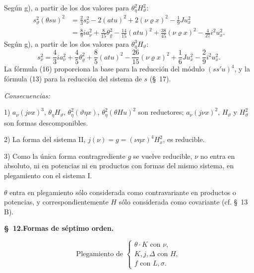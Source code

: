 \documentclass[11pt]{article}
\newcommand{\A}{\Delta}
\newcommand{\R}{\varrho}
\begin{document}
Según g), a partir de los dos valores para $\theta_\eta^2H_\vartheta^2$:
\[
\tag{15}
\begin{aligned}
s_\vartheta^2(\theta su)^2
&=\frac23s_\nu^2-2(atu)^2+2(\nu\R x)^2-\frac19Ju_x^2\\
&=\frac89ia_\nu^2+\frac8{15}\theta_\R^2-\frac{14}{15}(atu)^2+\frac{38}{45}(\nu\R x)^2-\frac4{27}i^2u_x^2.
\end{aligned}
\]
Según g), a partir de los dos valores para $\theta_\eta^3H_\vartheta$:
\[
\tag{16}
s_\nu^2=\frac43ia_\nu^2+\frac45\theta_\R^2+\frac85(atu)^2-\frac{26}{15}(\nu\R x)^2+\frac16Ju_x^2-\frac29i^2u_x^2.
\]
La fórmula (16) proporciona la base para la reducción del módulo $(ss'u)^4$, y la fórmula (13) para la reducción del sistema de $s$ (\S\ 17).

\noindent\emph{Consecuencias:}

1) $a_\nu(j\nu x)^3$, $\theta_\eta H_\vartheta$, $\theta_\eta^2(\vartheta\eta x)$, $\theta_\eta^2(\theta Hu)^2$ son reductores; $a_\nu(j\nu x)^2$, $H_\vartheta$ y $H_\vartheta^2$ son formas descomponibles.

2) La forma del sistema II, $j(\nu)=g=(\nu\eta x)^4H_x^2$, es reducible.

3) Como la única forma contragrediente $g$ se vuelve reducible, $\nu$ no entra en absoluto, ni en potencias ni en productos con formas del mismo sistema, en plegamiento con el sistema I.

$\theta$ entra en plegamiento sólo considerada como contravariante en productos o potencias, y correspondientemente $H$ sólo considerada como covariante (cf. \S\ 13 B).




\begin{center}
\textbf{\S\ 12.\quad Formas de séptimo orden.}
\end{center}
\[
\text{Plegamiento de }\left\{\begin{array}{l}
\theta\cdot K\text{ con }\nu,\\
K,j,\A\text{ con }H,\\
f\text{ con }L,\sigma.
\end{array}\right.
\]
\end{document}
